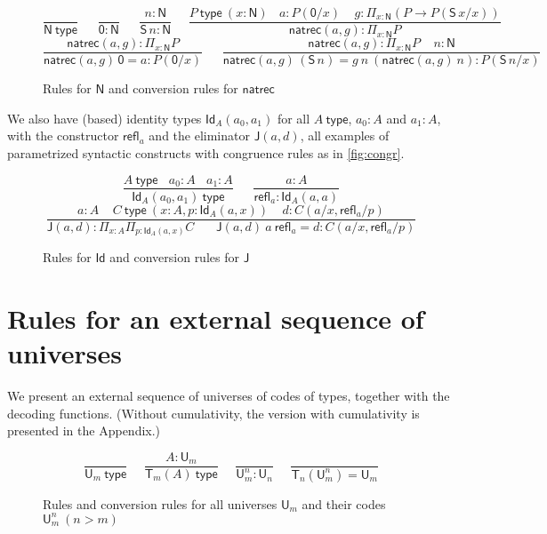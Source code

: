 \documentclass[11pt,a4paper]{article}
\theoremstyle{definition}
\newcommand{\Id}{\mathsf{Id}}
\newcommand{\NN}{\mathsf{N}}
\newcommand{\UU}{\mathsf{U}}
\newcommand{\JJ}{\mathsf{J}}
\newcommand{\ZERO}{\mathsf{0}}
\newcommand{\SUCC}{\mathsf{S}}
\newcommand{\type}{\mathsf{type}}
\newcommand{\mypi}[3]{\Pi_{#1:#2}#3}
\newcommand{\app}[2]{{#1\,#2}} %
\newcommand{\Sapp}[1]{\app{\SUCC}{#1}}
\newcommand{\sapp}[2]{{#1(#2)}} %
\newcommand{\Idapp}[3]{\sapp{\Id_#1}{#2,#3}}
\newcommand{\NRapp}[2]{\sapp{\natrec}{#1,#2}}
\newcommand{\Rfapp}[1]{{\refl_#1}}
\newcommand{\Japp}[2]{\sapp{\JJ}{#1,#2}}
\newcommand{\T}{\mathsf{T}}
\newcommand{\natrec}{\mathsf{natrec}}
\newcommand{\refl}{\mathsf{refl}}
\begin{document}
\begin{figure}[H]
  \caption{Rules for $\NN$ and conversion rules for $\natrec$}\label{fig:typeN}
$$
\frac{}{\NN~\type}~~~~~~~\frac{}{\ZERO:\NN}~~~~~~~
\frac{n:\NN}{\Sapp{n} : \NN}~~~~~~
\frac{P~\type~(x:\NN)~~~~a:P(\ZERO/x)~~~~~
g:\mypi{x}{\NN}{(P\to P(\Sapp{x}/x))}}
{\NRapp{a}{g}:\mypi{x}{\NN}{P}}
$$
$$
\frac{\NRapp{a}{g}:\mypi{x}{\NN}{P}}{\app{\NRapp{a}{g}}{\ZERO} = a: P(\ZERO/x)}
~~~~~~~
\frac{\NRapp{a}{g}:\mypi{x}{\NN}{P}~~~~~n:\NN}
{\app{\NRapp{a}{g}}{(\app{\SUCC}{n})} = g~n~(\NRapp{a}{g}~n): P(\Sapp{n}/x) } 
$$
\end{figure}

We also have (based) identity types $\Idapp{A}{a_0}{a_1}$ for all $A~\type$, 
$a_0:A$ and $a_1:A$, with the constructor $\Rfapp{a}$ and the eliminator 
$\Japp{a}{d}$, all examples of parametrized syntactic constructs
with congruence rules as in \cref{fig:congr}.

\begin{figure}[H]
  \caption{Rules for $\Id$ and conversion rules for $\JJ$}\label{fig:typeId}
$$
\frac{A~\type ~~~~ a_0:A ~~~~ a_1:A}{\Idapp{A}{a_0}{a_1}~\type}~~~~~~~
\frac{a:A}{\Rfapp{a}:\Idapp{A}{a}{a}}
$$
$$
\frac{a:A~~~~~C~\type~(x:A,p:\Idapp{A}{a}{x})~~~~~d:C(a/x,\Rfapp{a}/p)}
{\Japp{a}{d}:\mypi{x}{A}{\mypi{p}{\Idapp{A}{a}{x}}}{C}~~~~~~~~
 \Japp{a}{d}~a~\Rfapp{a} = d : C(a/x,\Rfapp{a}/p)}
$$
\end{figure}


\section{Rules for an external sequence of universes}


We present an external sequence of universes of codes of types, together
with the decoding functions. (Without cumulativity, 
the version with cumulativity is presented in the Appendix.)

\begin{figure}[H]
  \caption{Rules and conversion rules for all universes $\UU_m$ and their codes $\UU^{n}_{m}~(n>m)$}\label{fig:typeU}
$$
\frac{}{\UU_m~\type}~~~~~~
\frac{A:\UU_{m}}{\T_{m}(A)~\type}~~~~~~
\frac{}{\UU^{n}_{m}:\UU_{n}}~~~~~~
\frac{}{\T_{n}({\UU^{n}_{m}}) = \UU_{m}}
$$ 
\end{figure}
\end{document}
